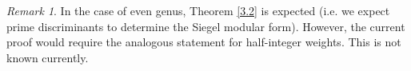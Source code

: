 \documentclass[11pt]{article}
\theoremstyle{definition}
\theoremstyle{remark}
\newtheorem*{remark}{Remark}
\begin{document}
\begin{remark}
    In the case of even genus, Theorem \ref{3.2} is expected (i.e. we expect prime discriminants to determine the Siegel modular form). However, the current proof would require the analogous statement for half-integer weights. This is not known currently. 
\end{remark}

\printbibliography
\end{document}
